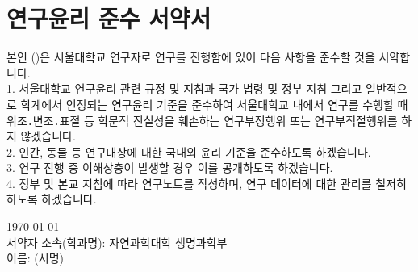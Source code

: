 \chapter*{연구윤리 준수 서약서}
\doublespacing
\makeatletter

본인 (\@author)은 서울대학교 연구자로 연구를 진행함에 있어 다음 사항을 준수할 것을 서약합니다. \\

1. 서울대학교 연구윤리 관련 규정 및 지침과 국가 법령 및 정부 지침 그리고 일반적으로 학계에서 인정되는 연구윤리 기준을 준수하여 서울대학교 내에서 연구를 수행할 때 위조․변조․표절 등 학문적 진실성을 훼손하는 연구부정행위 또는 연구부적절행위를 하지 않겠습니다. \\

2. 인간, 동물 등 연구대상에 대한 국내외 윤리 기준을 준수하도록 하겠습니다. \\

3. 연구 진행 중 이해상충이 발생할 경우 이를 공개하도록 하겠습니다. \\

4. 정부 및 본교 지침에 따라 연구노트를 작성하며, 연구 데이터에 대한 관리를 철저히 하도록 하겠습니다. \\

\begin{center}
  \today \\
  서약자 소속(학과명): 자연과학대학 생명과학부 \\
  이름: \@author \quad (서명) \\
\end{center}
\makeatother
